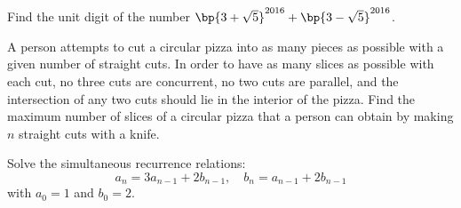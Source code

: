 \begin{problem}[C]
    Find the unit digit of the number $\bp{3 + \sqrt5}^{2016} + \bp{3 - \sqrt5}^{2016}$.
\end{problem}

\begin{problem}[C]
    A person attempts to cut a circular pizza into as many pieces as possible with a given number of straight cuts. In order to have as many slices as possible with each cut, no three cuts are concurrent, no two cuts are parallel, and the intersection of any two cuts should lie in the interior of the pizza. Find the maximum number of slices of a circular pizza that a person can obtain by making $n$ straight cuts with a knife.
\end{problem}

\begin{problem}[C]
    Solve the simultaneous recurrence relations: \[a_n = 3a_{n-1} + 2b_{n-1}, \quad b_n = a_{n-1} + 2b_{n-1}\] with $a_0 = 1$ and $b_0 = 2$.
\end{problem}
